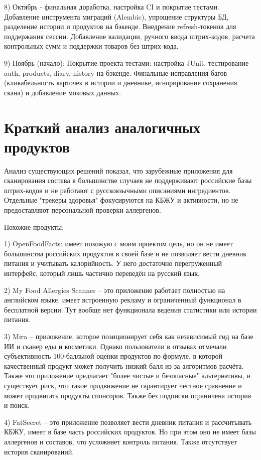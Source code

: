 \documentclass[14pt,a4paper]{extarticle}
\begin{document}
8) Октябрь - финальная доработка, настройка CI и покрытие тестами.
Добавление инструмента миграций (Alembic), упрощение структуры БД, разделение истории и продуктов на бэкенде. Внедрение refresh-токенов для поддержания сессии. Добавление валидации, ручного ввода штрих-кодов, расчета контрольных сумм и поддержки товаров без штрих-кода.

9) Ноябрь (начало): Покрытие проекта тестами: настройка JUnit, тестирование auth, products, diary, history на бэкенде. Финальные исправления багов (кликабельность карточек в истории и дневнике, игнорирование сохранения скана) и добавление моковых данных.



\section{Краткий анализ аналогичных продуктов}

Анализ существующих решений показал, что зарубежные приложения для сканирования состава в большинстве случаев не поддерживают российские базы штрих-кодов и не работают с русскоязычными описаниями ингредиентов. Отдельные "трекеры здоровья" фокусируются на КБЖУ и активности, но не предоставляют персональной проверки аллергенов.

Похожие продукты:

1) OpenFoodFacts: имеет похожую с моим проектом цель, но он не имеет большинства российских продуктов в своей базе и не позволяет вести дневник питания и учитывать калорийность. У него достаточно перегруженный интерфейс, который лишь частично переведён на русский язык.

2) My Food Allergies Scanner – это приложение работает полностью на английском языке, имеет встроенную рекламу и ограниченный функционал в бесплатной версии. Тут вообще нет функционала ведения статистики или истории питания.

3) Mira – приложение, которое позиционирует себя как независимый гид на базе ИИ и сканер еды и косметики. Однако пользователи в отзывах отмечали субъективность 100-балльной оценки продуктов по формуле, в которой качественный продукт может получить низкий балл из-за алгоритмов расчёта. Также это приложение предлагает "более чистые и безопасные" альтернативы, и существует риск, что такое продвижение не гарантирует честное сравнение и может продвигать продукты спонсоров. Также без подписки ограничена история и поиск.

4) FatSecret – это приложение позволяет вести дневник питания и рассчитывать КБЖУ, имеет в базе часть российских продуктов. Но при этом оно не имеет базы аллергенов и составов, что усложняет контроль питания. Также отсутствует история сканирований.
\end{document}
